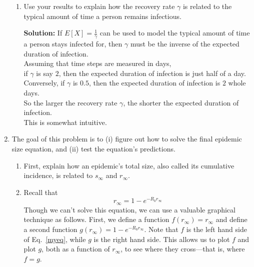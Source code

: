 \documentclass[11pt]{article}
\newenvironment{solution}{\par\noindent\begingroup\color{BrickRed}\textbf{Solution:} }{\par\endgroup}
\begin{document}
\begin{enumerate}
\begin{enumerate}[label=\alph*.]
	\item Use your results to explain how the recovery rate $\gamma$ is related to the typical amount of time a person remains infectious.
		\begin{solution} \newline \newline
			If $E[X] = \frac{1}{\gamma}$ can be used to model the typical amount of time a person stays infected for,
			then $\gamma$ must be the inverse of the expected duration of infection. \\
			Assuming that time steps are measured in days, \\
			if $\gamma$ is say $2$, then the expected duration of infection is just half of a day. \\
			Conversely, if $\gamma$ is $0.5$, then the expected duration of infection is $2$ whole days. \\
			So the larger the recovery rate $\gamma$, the shorter the expected duration of infection. \\
			This is somewhat intuitive.
		\end{solution}
\end{enumerate}

\clearpage
\item The goal of this problem is to (i) figure out how to solve the final epidemic size equation, and (ii) test the equation's predictions.

	\begin{enumerate}[label=\alph*.]
		\item First, explain how an epidemic's total size, also called its cumulative incidence, is related to $s_\infty$ and $r_\infty$. 
		\item Recall that 
		\begin{equation}r_\infty = 1-e^{-R_0 r_\infty}\label{myeq}\end{equation} 
		Though we can't solve this equation, we can use a valuable graphical technique as follows. First, we define a function $f(r_\infty) = r_\infty$ and define a second function $g(r_\infty) = 1-e^{-R_0 r_\infty}$. Note that $f$ is the left hand side of Eq.~\eqref{myeq}, while $g$ is the right hand side. This allows us to plot $f$ and plot $g$, both as a function of $r_\infty$, to see where they cross---that is, where $f=g$. 
		

\end{enumerate}
\end{enumerate}
\end{document}
